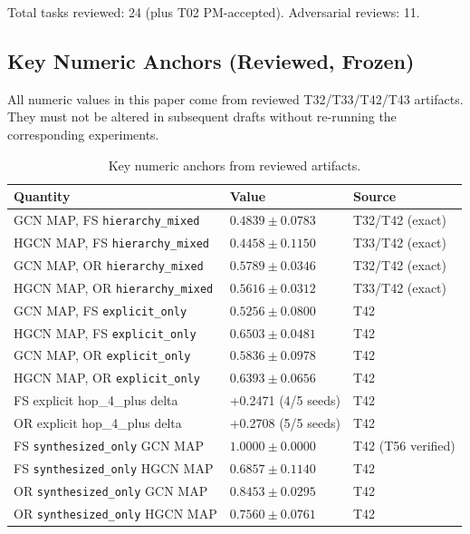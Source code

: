 \documentclass[runningheads]{llncs}
\begin{document}
Total tasks reviewed: 24 (plus T02 PM-accepted). Adversarial reviews: 11.

\subsection{Key Numeric Anchors (Reviewed, Frozen)}

All numeric values in this paper come from reviewed T32/T33/T42/T43 artifacts. They must not be altered in subsequent drafts without re-running the corresponding experiments.

\begin{table}[h]
\centering
\caption{Key numeric anchors from reviewed artifacts.}
\begin{tabular}{lll}
\toprule
Quantity & Value & Source \\
\midrule
GCN MAP, FS \texttt{hierarchy\_mixed} & $0.4839 \pm 0.0783$ & T32/T42 (exact) \\
HGCN MAP, FS \texttt{hierarchy\_mixed} & $0.4458 \pm 0.1150$ & T33/T42 (exact) \\
GCN MAP, OR \texttt{hierarchy\_mixed} & $0.5789 \pm 0.0346$ & T32/T42 (exact) \\
HGCN MAP, OR \texttt{hierarchy\_mixed} & $0.5616 \pm 0.0312$ & T33/T42 (exact) \\
GCN MAP, FS \texttt{explicit\_only} & $0.5256 \pm 0.0800$ & T42 \\
HGCN MAP, FS \texttt{explicit\_only} & $0.6503 \pm 0.0481$ & T42 \\
GCN MAP, OR \texttt{explicit\_only} & $0.5836 \pm 0.0978$ & T42 \\
HGCN MAP, OR \texttt{explicit\_only} & $0.6393 \pm 0.0656$ & T42 \\
FS explicit hop\_4\_plus delta & +0.2471 (4/5 seeds) & T42 \\
OR explicit hop\_4\_plus delta & +0.2708 (5/5 seeds) & T42 \\
FS \texttt{synthesized\_only} GCN MAP & $1.0000 \pm 0.0000$ & T42 (T56 verified) \\
FS \texttt{synthesized\_only} HGCN MAP & $0.6857 \pm 0.1140$ & T42 \\
OR \texttt{synthesized\_only} GCN MAP & $0.8453 \pm 0.0295$ & T42 \\
OR \texttt{synthesized\_only} HGCN MAP & $0.7560 \pm 0.0761$ & T42 \\
\bottomrule
\end{tabular}
\end{table}
\end{document}
